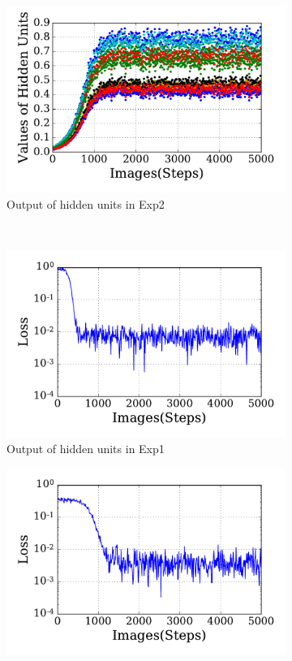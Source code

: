 \begin{figure}
\begin{subfigure}[t]{0.45\textwidth}
		\includegraphics[width=\textwidth]{pics_sdlm/21_exp_AE_noise/exp2_hid_s.pdf}
		\caption{Output of hidden units in Exp2}
	\end{subfigure}\\
	\begin{subfigure}[t]{0.45\textwidth}
		\includegraphics[width=\textwidth]{pics_sdlm/21_exp_AE_noise/exp1_loss_s.pdf}
		\caption{Output of hidden units in Exp1}
	\end{subfigure}
	\begin{subfigure}[t]{0.45\textwidth}
		\includegraphics[width=\textwidth]{pics_sdlm/21_exp_AE_noise/exp2_loss_s.pdf}

\end{subfigure}
\end{figure}
